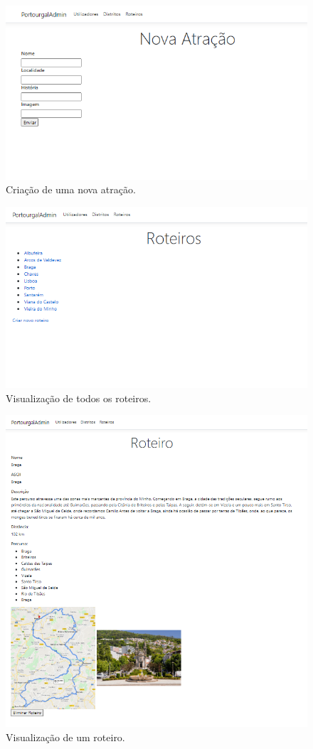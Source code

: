 \begin{figure}[H]
\centering
\includegraphics[width=0.7\linewidth]{images/site_nova_atracao.png}
\caption{Criação de uma nova atração.}
\end{figure}

\begin{figure}[H]
\centering
\includegraphics[width=0.7\linewidth]{images/site_roteiros.png}
\caption{Visualização de todos os roteiros.}
\end{figure}

\begin{figure}[H]
\centering
\includegraphics[width=0.7\linewidth]{images/site_roteiro.png}
\caption{Visualização de um roteiro.}
\end{figure}
